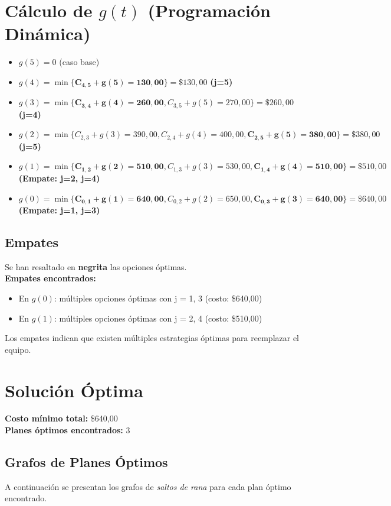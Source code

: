 \documentclass[12pt]{article}
\begin{document}
\clearpage
\section*{Cálculo de $g(t)$ (Programación Dinámica)}
\begin{itemize}
\item $g(5) = 0$ (caso base)
\item $g(4) = \min\{ \mathbf{C_{4,5} + g(5) = 130,00}\} = \$130,00$ \textbf{(j=5)}
\item $g(3) = \min\{ \mathbf{C_{3,4} + g(4) = 260,00}, C_{3,5} + g(5) = 270,00\} = \$260,00$ \textbf{(j=4)}
\item $g(2) = \min\{ C_{2,3} + g(3) = 390,00, C_{2,4} + g(4) = 400,00, \mathbf{C_{2,5} + g(5) = 380,00}\} = \$380,00$ \textbf{(j=5)}
\item $g(1) = \min\{ \mathbf{C_{1,2} + g(2) = 510,00}, C_{1,3} + g(3) = 530,00, \mathbf{C_{1,4} + g(4) = 510,00}\} = \$510,00$ \textbf{(Empate: j=2, j=4)}
\item $g(0) = \min\{ \mathbf{C_{0,1} + g(1) = 640,00}, C_{0,2} + g(2) = 650,00, \mathbf{C_{0,3} + g(3) = 640,00}\} = \$640,00$ \textbf{(Empate: j=1, j=3)}
\end{itemize}

\subsection*{Empates}
Se han resaltado en \textbf{negrita} las opciones óptimas.\\
\textbf{Empates encontrados:}
\begin{itemize}
\item En $g(0)$: múltiples opciones óptimas con j = 1, 3 (costo: \$640,00)
\item En $g(1)$: múltiples opciones óptimas con j = 2, 4 (costo: \$510,00)
\end{itemize}
Los empates indican que existen múltiples estrategias óptimas para reemplazar el equipo.\\
\clearpage
\section*{Solución Óptima}
\textbf{Costo mínimo total:} \$640,00\\
\textbf{Planes óptimos encontrados:} 3
\subsection*{Grafos de Planes Óptimos}
A continuación se presentan los grafos de \emph{saltos de rana} para cada plan óptimo encontrado.
\end{document}
